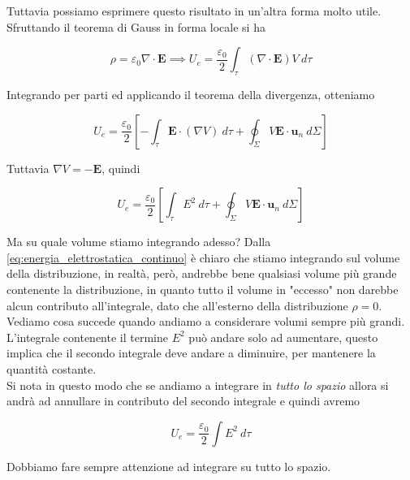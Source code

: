 Tuttavia possiamo esprimere questo risultato in un'altra forma molto utile.\\
Sfruttando il teorema di Gauss in forma locale si ha 

\begin{equation*}
    \rho = \varepsilon_0 \nabla \cdot \mathbf{E} \implies U_e = \frac{\varepsilon_0}{2} \int_{\tau} (\nabla \cdot \mathbf{E}) V \ d \tau
\end{equation*}

Integrando per parti ed applicando il teorema della divergenza, otteniamo

\begin{equation}
    U_e = \frac{\varepsilon_0}{2} \left[ - \int_{\tau} \mathbf{E} \cdot (\nabla V) \ d \tau + \oint_{\Sigma} V \mathbf{E} \cdot \mathbf{u}_n \ d\Sigma \right]
\end{equation}

Tuttavia $\nabla V = - \mathbf{E}$, quindi 

\begin{equation}
    U_e = \frac{\varepsilon_0}{2} \left[  \int_{\tau} E^2 \ d \tau + \oint_{\Sigma} V \mathbf{E} \cdot \mathbf{u}_n \ d\Sigma \right]
\end{equation}

Ma su quale volume stiamo integrando adesso? Dalla \ref{eq:energia_elettrostatica_continuo} è chiaro che stiamo integrando sul volume della distribuzione, in realtà, però, andrebbe bene qualsiasi volume più grande contenente la distribuzione, in quanto tutto il volume in "eccesso" non darebbe alcun contributo all'integrale, dato che all'esterno della distribuzione $\rho = 0$. \\

Vediamo cosa succede quando andiamo a considerare volumi sempre più grandi. L'integrale contenente il termine $E^2$ può andare solo ad aumentare, questo implica che il secondo integrale deve andare a diminuire, per mantenere la quantità costante. \\

Si nota in questo modo che se andiamo a integrare in \emph{tutto lo spazio} allora si andrà ad annullare in contributo del secondo integrale e quindi avremo 

\begin{tcolorbox}[colback=yellow!10!white, colframe=orange!70!black, boxrule=0.8pt]
\begin{equation}
    U_e = \frac{\varepsilon_0}{2} \int E^2 \ d \tau
\end{equation}
\label{eq:energia_elettrostatica_campo}
\end{tcolorbox}

Dobbiamo fare sempre attenzione ad integrare su tutto lo spazio. 
